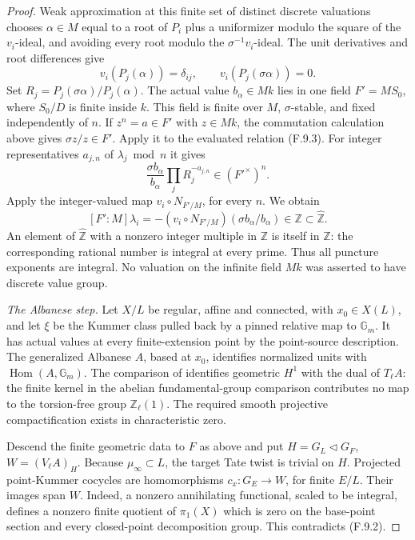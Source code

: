 \documentclass[11pt]{article}
\begin{document}
\begin{proof}
Weak approximation at this finite set of distinct discrete
valuations chooses \(\alpha\in M\) equal to a root of \(P_i\)
plus a uniformizer modulo the square of the \(v_i\)-ideal, and
avoiding every root modulo the \(\sigma^{-1}v_i\)-ideal.
The unit derivatives and root differences give
\[
 v_i(P_j(\alpha))=\delta_{ij},\qquad
 v_i(P_j(\sigma\alpha))=0.                               \tag{F.9.4}
\]
Set \(R_j=P_j(\sigma\alpha)/P_j(\alpha)\). The actual value
\(b_\alpha\in Mk\) lies in one field \(F'=MS_0\), where
\(S_0/D\) is finite inside \(k\). This field is finite over
\(M\), \(\sigma\)-stable, and fixed independently of \(n\).
If \(z^n=a\in F'\) with \(z\in Mk\), the commutation
calculation above gives \(\sigma z/z\in F'\). Apply it to
the evaluated relation (F.9.3). For integer representatives
\(a_{j,n}\) of \(\lambda_j\bmod n\) it gives
\[
 \frac{\sigma b_\alpha}{b_\alpha}
       \prod_jR_j^{-a_{j,n}}\in(F'^\times)^n.
\]
Apply the integer-valued map \(v_i\circ N_{F'/M}\), for every
\(n\). We obtain
\[
 [F':M]\lambda_i
       =-(v_i\circ N_{F'/M})(\sigma b_\alpha/b_\alpha)
                     \in\mathbb Z\subset\widehat{\mathbb Z}.
                                                               \tag{F.9.5}
\]
An element of \(\widehat{\mathbb Z}\) with a nonzero integer
multiple in \(\mathbb Z\) is itself in \(\mathbb Z\): the
corresponding rational number is integral at every prime. Thus
all puncture exponents are integral. No valuation on the infinite
field \(Mk\) was asserted to have discrete value group.

\emph{The Albanese step.}
Let \(X/L\) be regular, affine and connected, with
\(x_0\in X(L)\), and let \(\xi\) be the Kummer class pulled
back by a pinned relative map to \(\mathbb G_m\). It has actual
values at every finite-extension point by the point-source
description. The generalized Albanese \(A\), based at \(x_0\),
identifies normalized units with \(\operatorname{Hom}(A,\mathbb G_m)\).
The comparison of \citet[Section~3, Proposition~4.1,
Corollary~4.2, Proposition~4.3]{FF_SpiessSzamuely2003} identifies
geometric \(H^1\) with the dual of \(T_\ell A\): the finite
kernel in the abelian fundamental-group comparison contributes
no map to the torsion-free group \(\mathbb Z_\ell(1)\).
The required smooth projective compactification exists in
characteristic zero.

Descend the finite geometric data to \(F\) as above and put
\(H=G_L\triangleleft G_F\), \(W=(V_\ell A)_H\). Because
\(\mu_\infty\subset L\), the target Tate twist is trivial
on \(H\). Projected point-Kummer cocycles are homomorphisms
\(c_x:G_E\to W\), for finite \(E/L\). Their images span \(W\).
Indeed, a nonzero annihilating functional, scaled to be integral,
defines a nonzero finite quotient of \(\pi_1(X)\) which is zero
on the base-point section and every closed-point decomposition
group. This contradicts (F.9.2).


\end{proof}
\end{document}
